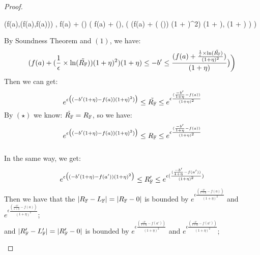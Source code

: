 \documentclass[a4paper,11pt]{article}
\begin{document}
\begin{proof}
\begin{itemize}
{\begin{mathpar}
{{				(f(a),(f(a),f(a)))
				}
			}
				{
				\trsenv,
				f(a) +  \times \ln(\tilde{\fvarR})
				\trsto
				\bigg(
				f(a) +  \times \ln(\fvarR),
				\big( (f(a) + 
				( \times \ln(\tilde{\fvarR}))
				(1 + \eta)^2)
				{(1 + \eta)},
				{(1 + \eta)}
				 \big)
				\bigg)
				}
		\end{mathpar}	
}		%
		By Soundness Theorem and $(1)$, we have:
		\[
		(f(a) + 
				(\frac{1}{\epsilon} \times \ln(\tilde{R_{\mathbb{F}}}))
				(1 + \eta)^2)
				{(1 + \eta)}
		\leq
		-b'
		\leq
		\frac{(
				f(a) + \frac{\frac{1}{\epsilon} 
				\times \ln(\tilde{R_{\mathbb{F}}})}
				{(1 + \eta)^2}
				)}
				{(1 + \eta)}
				 \big)
				\bigg)
		\]
		Then we can get:
		\[
		e^{\epsilon 
		\big( (-b'(1 + \eta) - f(a)) (1 + \eta)^2) \big)}
		\leq
		\tilde{R_{\mathbb{F}}}
		\leq
		e^{\epsilon 
		\frac{(\frac{-b'}{1 + \eta} - f(a))}{(1 + \eta)^2}}
		\]
		By $(\star)$ we know: $\tilde{R_{\mathbb{F}}} = R_{\mathbb{F}}$, so we have:
		\[
		e^{\epsilon 
		\big( (-b'(1 + \eta) - f(a)) (1 + \eta)^2) \big)}
		\leq
		R_{\mathbb{F}}
		\leq
		e^{\epsilon 
		\frac{(\frac{-b'}{1 + \eta} - f(a))}{(1 + \eta)^2}}
		\]
		\\		
		In the same way, we get:
		\[
		e^{\epsilon 
		\big((-b'(1 + \eta) - f(a'))(1 + \eta)^2 \big)}
		\leq
		R_{\mathbb{F}}'
		\leq
		e^{\epsilon 
		(\frac{(\frac{-b'}{1 + \eta} - f(a'))}{(1 + \eta)^2})}
		\]
		Then we have that the $|R_{\mathbb{F}} - L_{\mathbb{F}}| = |R_{\mathbb{F}} - 0|$ is bounded by 
		$e^{\epsilon 
		\frac{(\frac{-b'}{1 + \eta} - f(a))}{(1 + \eta)^2}}$ 
		and $e^{\epsilon 
		\frac{(\frac{-b'}{1 + \eta} - f(a))}{(1 + \eta)^2}}$;
		\\
		and $|R_{\mathbb{F}}' - L_{\mathbb{F}}'| = |R_{\mathbb{F}}' - 0|$ is bounded by 
		$e^{\epsilon 
		\frac{(\frac{-b'}{1 + \eta} - f(a'))}{(1 + \eta)^2}}$ 
		and $e^{\epsilon 
		\frac{(\frac{-b'}{1 + \eta} - f(a'))}{(1 + \eta)^2}}$;
		


\end{itemize}
\end{proof}
\end{document}
